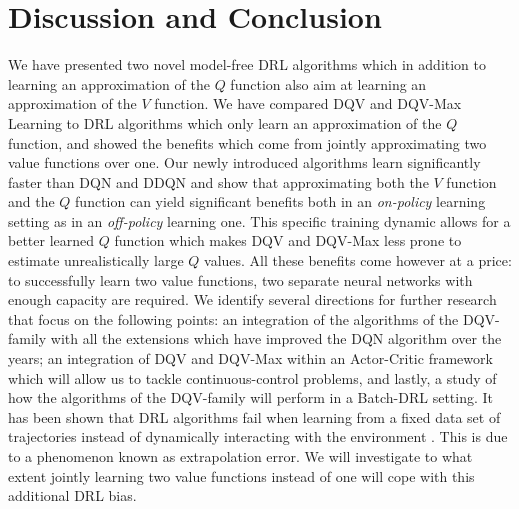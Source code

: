 \section{Discussion and Conclusion}
We have presented two novel model-free DRL algorithms which in addition to learning an approximation of the $Q$ function also aim at learning an approximation of the $V$ function. We have compared DQV and DQV-Max Learning to DRL algorithms which only learn an approximation of the $Q$ function, and showed the benefits which come from jointly approximating two value functions over one. Our newly introduced algorithms learn significantly faster than DQN and DDQN and show that approximating both the $V$ function and the $Q$ function can yield significant benefits both in an \textit{on-policy} learning setting as in an \textit{off-policy} learning one. This specific training dynamic allows for a better learned $Q$ function which makes DQV and DQV-Max less prone to estimate unrealistically large $Q$ values. All these benefits come however at a price: to successfully learn two value functions, two separate neural networks with enough capacity are required. We identify several directions for further research that focus on the following points: an integration of the algorithms of the DQV-family with all the extensions which have improved the DQN algorithm over the years; an integration of DQV and DQV-Max within an Actor-Critic framework which will allow us to tackle continuous-control problems, and lastly, a study of how the algorithms of the DQV-family will perform in a Batch-DRL setting. It has been shown that DRL algorithms fail when learning from a fixed data set of trajectories instead of dynamically interacting with the environment \cite{fujimoto2019benchmarking}. This is due to a phenomenon known as extrapolation error. We will investigate to what extent jointly learning two value functions instead of one will cope with this additional DRL bias.
